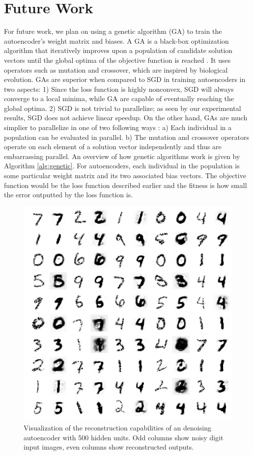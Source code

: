 \documentclass[conference]{IEEEtran}
\begin{document}
\section{Future Work}
For future work, we plan on using a genetic algorithm (GA) to train the autoencoder's weight matrix and biases. A GA is a black-box optimization algorithm that iteratively improves upon a population of candidate solution vectors until the global optima of the objective function is reached \cite{srinivas1994genetic}. It uses operators such as mutation and crossover, which are inspired by biological evolution. GAs are superior when compared to SGD in training autoencoders in two aspects: 1) Since the loss function is highly nonconvex, SGD will always converge to a local minima, while GA are capable of eventually reaching the global optima. 2) SGD is not trivial to parallelize; as seen by our experimental results, SGD does not achieve linear speedup. On the other hand, GAs are much simplier to parallelize in one of two following ways \cite{cantu1998survey}: a) Each individual in a population can be evaluated in parallel. b) The mutation and crossover operators operate on each element of a solution vector independently and thus are embarrassing parallel. An overview of how genetic algorithms work is given by Algorithm \ref{alg:genetic}. For autoencoders, each individual in the population is some particular weight matrix and its two associated bias vectors. The objective function would be the loss function described earlier and the fitness is how small the error outputted by the loss function is. 

\begin{figure}[h]
\centering
\includegraphics[width=0.8\linewidth]{experiment3_2.png}
\caption{Visualization of the reconstruction capabilities of an denoising autoencoder with 500 hidden units. Odd columns show noisy digit input images, even columns show reconstructed outputs.}
\label{fig:experiment3_2}
\end{figure}
\end{document}
